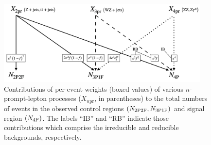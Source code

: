 \begin{figure}[!htbp]
	\begin{center}
		\includegraphics[width=0.95\textwidth]{figures/higgsmassmeas/redbkg/promptwgts_to_CRSR.png}
		\caption{
			Contributions of per-event weights (boxed values) of various $n$-prompt-lepton processes ($X_{n\text{pr}}$, in parentheses) to the total numbers of events in the observed control regions $\left( N_{\text{2P2F}}, N_{\text{3P1F}} \right)$ and signal region $\left( N_\text{4P} \right)$.
			The labels ``IB'' and ``RB'' indicate those contributions which comprise the irreducible and reducible backgrounds, respectively.
		}
		\label{fig:prompt_to_crs}
	\end{center}
\end{figure}

